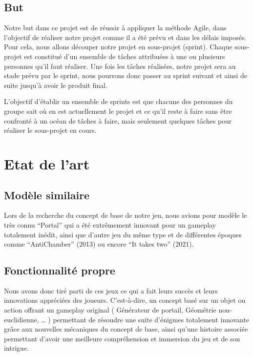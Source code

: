 \documentclass[a4paper,11pt]{article}
\begin{document}
\subsection{But}

Notre but dans ce projet est de réussir à appliquer la méthode Agile, dans l’objectif 
de réaliser notre projet comme il a été prévu et dans les délais imposés.
Pour cela, nous allons découper notre projet en sous-projet (sprint).
Chaque sous-projet est constitué d’un ensemble de tâches attribuées à une ou plusieurs 
personnes qu’il faut réaliser. Une fois les tâches réalisées, notre projet sera au stade 
prévu par le sprint, nous pourrons donc passer au sprint suivant et ainsi de suite jusqu’à avoir le produit final.\newline

L'objectif d’établir un ensemble de sprints est que chacune des personnes du groupe sait 
où en est actuellement le projet et ce qu’il reste à faire sans être confronté à un océan de 
tâches à faire, mais seulement quelques tâches pour réaliser le sous-projet en cours.


\section{Etat de l’art}

\subsection{Modèle similaire}

Lors de la recherche du concept de base de notre jeu, nous avions pour modèle le très connu “Portal” 
qui a été extrêmement innovant pour un gameplay totalement inédit, ainsi que d’autre jeu du même type et 
de différentes époques comme “AntiChamber” (2013) ou encore “It takes two” (2021). 

\subsection{Fonctionnalité propre}

Nous avons donc tiré parti de ces jeux ce qui a fait leurs succès et leurs innovations appréciées des joueurs. C’est-à-dire, 
un concept basé sur un objet ou action offrant un gameplay original ( Générateur de portail, Géométrie non-euclidienne, … ) permettant de résoudre 
une suite d'énigmes totalement innovante grâce aux nouvelles mécaniques du concept de base, ainsi qu’une 
histoire associée permettant d’avoir une meilleure compréhension et immersion du jeu et de son intrigue.
\end{document}
